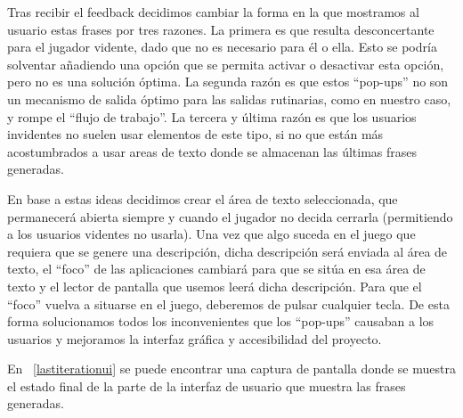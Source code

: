 Tras recibir el feedback decidimos cambiar la forma en la que mostramos al usuario estas frases por tres razones. La primera es que resulta desconcertante para el jugador vidente, dado que no es necesario para él o ella. Esto se podría solventar añadiendo una opción que se permita activar o desactivar esta opción, pero no es una solución óptima.
La segunda razón es que estos ``pop-ups'' no son un mecanismo de salida óptimo para las salidas rutinarias, como en nuestro caso, y rompe el ``flujo de trabajo''.
La tercera y última razón es que los usuarios invidentes no suelen usar elementos de este tipo, si no que están más acostumbrados a usar areas de texto donde se almacenan las últimas frases generadas.

En base a estas ideas decidimos crear el área de texto seleccionada, que permanecerá abierta siempre y cuando el jugador no decida cerrarla (permitiendo a los usuarios videntes no usarla). Una vez que algo suceda en el juego que requiera que se genere una descripción, dicha descripción será enviada al área de texto, el ``foco'' de las aplicaciones cambiará para que se sitúa en esa área de texto y el lector de pantalla que usemos leerá dicha descripción. Para que el ``foco'' vuelva a situarse en el juego, deberemos de pulsar cualquier tecla.
De esta forma solucionamos todos los inconvenientes que los ``pop-ups'' causaban a los usuarios y mejoramos la interfaz gráfica y accesibilidad del proyecto.

En ~\ref{lastiterationui} se puede encontrar una captura de pantalla donde se muestra el estado final de la parte de la interfaz de usuario que muestra las frases generadas.

